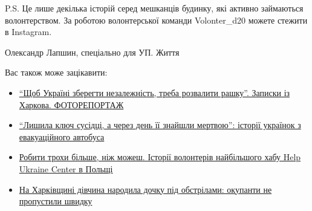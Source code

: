 P.S. Це лише декілька історій серед мешканців будинку, які активно займаються
волонтерством. За роботою волонтерської команди Volonter\_d20 можете стежити в
Instagram.

Олександр Лапшин, спеціально для УП. Життя

Вас також може зацікавити:

\begin{itemize}
\item \href{https://life.pravda.com.ua/society/2022/03/25/247961/}{\enquote{Щоб Україні зберегти незалежність, треба розвалити рашку}. Записки із Харкова. ФОТОРЕПОРТАЖ}
\item \href{https://life.pravda.com.ua/society/2022/03/29/248010/}{\enquote{Лишила ключ сусідці, а через день її знайшли мертвою}: історії українок з евакуаційного автобуса}
\item \href{https://life.pravda.com.ua/society/2022/04/15/248248/}{Робити трохи більше, ніж можеш. Історії волонтерів найбільшого хабу Help Ukraine Center в Польщі}
\item \href{https://life.pravda.com.ua/society/2022/03/12/247782/}{На Харківщині дівчина народила дочку під обстрілами: окупанти не пропустили швидку}
\end{itemize}

